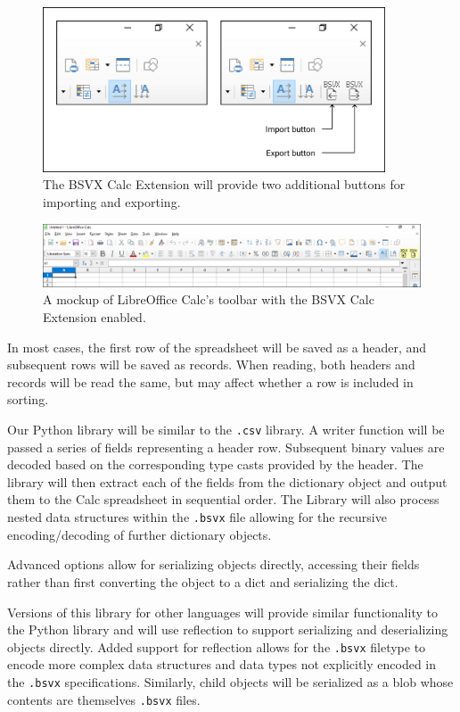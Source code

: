 \documentclass[10pt]{article}
\begin{document}
\begin{figure}[htp]
\centering
\includegraphics[width=4in]{figures/mockupPart2.png}
\caption{The BSVX Calc Extension will provide two additional buttons for importing and exporting.}
\label{fig:deliverables_mockupPart2}
\end{figure}

\begin{figure}[htp]
\centering
\includegraphics[width=\textwidth]{figures/mockupPart3.png}
\caption{A mockup of LibreOffice Calc's toolbar with the BSVX Calc Extension enabled.}
\label{fig:deliverables_mockupPart3}
\end{figure}

\indent{}
In most cases, the first row of the spreadsheet will be saved as a header, and subsequent rows will be saved as records.
When reading, both headers and records will be read the same, but may affect whether a row is included in sorting.

\indent{}
Our Python library will be similar to the \texttt{.csv} library.
A writer function will be passed a series of fields representing a header row. 
Subsequent binary values are decoded based on the corresponding type casts provided by the header.
The library will then extract each of the fields from the dictionary object and output them to the Calc spreadsheet in sequential order.
The Library will also process nested data structures within the \texttt{.bsvx} file allowing for the recursive encoding/decoding of further dictionary objects.

\indent{}
Advanced options allow for serializing objects directly, accessing their fields rather than first converting the object to a dict and serializing the dict.

\indent{}
Versions of this library for other languages will provide similar functionality to the Python library and will use reflection to support serializing and deserializing objects directly.
Added support for reflection allows for the \texttt{.bsvx} filetype to encode more complex data structures and data types not explicitly encoded in the \texttt{.bsvx} specifications.
Similarly, child objects will be serialized as a blob whose contents are themselves \texttt{.bsvx} files.
\end{document}
